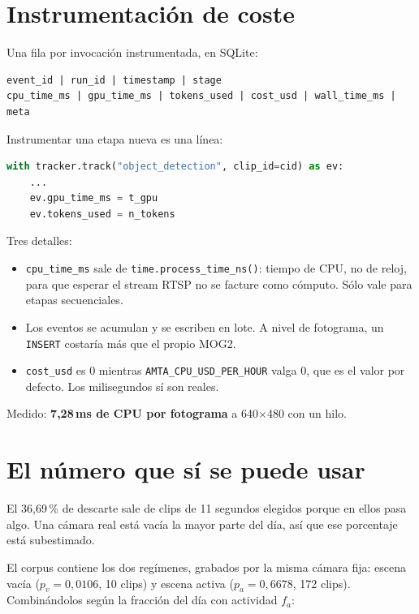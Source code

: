 \documentclass[11pt,a4paper]{article}
\begin{document}
\section{Instrumentación de coste}

Una fila por invocación instrumentada, en SQLite:

\begin{lstlisting}
event_id | run_id | timestamp | stage
cpu_time_ms | gpu_time_ms | tokens_used | cost_usd | wall_time_ms | meta
\end{lstlisting}

Instrumentar una etapa nueva es una línea:

\begin{lstlisting}[language=Python]
with tracker.track("object_detection", clip_id=cid) as ev:
    ...
    ev.gpu_time_ms = t_gpu
    ev.tokens_used = n_tokens
\end{lstlisting}

Tres detalles:

\begin{itemize}[leftmargin=*]
  \item \texttt{cpu\_time\_ms} sale de \texttt{time.process\_time\_ns()}: tiempo
        de CPU, no de reloj, para que esperar el stream RTSP no se facture como
        cómputo. Sólo vale para etapas secuenciales.
  \item Los eventos se acumulan y se escriben en lote. A nivel de fotograma, un
        \texttt{INSERT} costaría más que el propio MOG2.
  \item \texttt{cost\_usd} es 0 mientras \texttt{AMTA\_CPU\_USD\_PER\_HOUR} valga
        0, que es el valor por defecto. Los milisegundos sí son reales.
\end{itemize}

Medido: \textbf{7,28\,ms de CPU por fotograma} a 640$\times$480 con un hilo.

\section{El número que sí se puede usar}

El 36,69\,\% de descarte sale de clips de 11 segundos elegidos porque en ellos
pasa algo. Una cámara real está vacía la mayor parte del día, así que ese
porcentaje está subestimado.

El corpus contiene los dos regímenes, grabados por la misma cámara fija:
escena vacía ($p_v = 0{,}0106$, 10 clips) y escena activa ($p_a = 0{,}6678$, 172
clips). Combinándolos según la fracción del día con actividad $f_a$:
\end{document}
